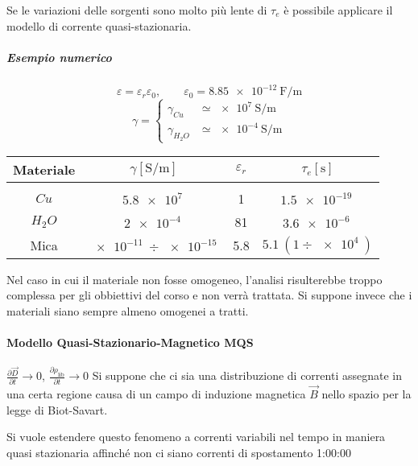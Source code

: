 Se le variazioni delle sorgenti sono molto più lente di $\tau_e$ è possibile applicare
il modello di corrente quasi-stazionaria.
\newpage
\subparagraph{Esempio numerico}
$$
\varepsilon = \varepsilon_r\varepsilon_0,\qquad \varepsilon_0 = \SI{8.85e-12}{\farad\per\meter}
$$
$$
\gamma = 
\begin{cases}
\gamma_{Cu} &\simeq \SI{e7}{\siemens\per\meter}\\
\gamma_{H_2O} &\simeq \SI{e-4}{\siemens\per\meter}
\end{cases}
$$
\begin{table}[H]\centering
\begin{tabular}{|c|c|c|c|}
 \hline Materiale & $\gamma[\si{\siemens\per\meter}]$ & $\varepsilon_r$ & $\tau_e[\si{\second}]$ \\
 \hline  &                                          &               &               \\
 $Cu$        & $\SI{5.8e7}{}$                    &   1           &   $\SI{1.5e-19}{}$ \\ 
 $H_2O$           & $\SI{2e-4}{} $                   &       81         & $\SI{3.6e-6}{}$ \\  
 Mica               & $\SI{e-11}{}\div\SI{e-15}{}$       &  5.8        &   $\SI{5.1}{}\left(1\div\SI{e4}{}\right)$ \\ \hline
\end{tabular}
\end{table}

Nel caso in cui il materiale non fosse omogeneo, l'analisi risulterebbe troppo complessa per gli
obbiettivi del corso e non verrà trattata. Si suppone invece che i materiali siano sempre almeno 
omogenei a tratti.

\paragraph{Modello Quasi-Stazionario-Magnetico MQS}
$\frac{\partial\vec{D}}{\partial t} \to 0$, $\frac{\partial\rho_\text{lib}}{\partial t}\to 0$
Si suppone che ci sia una distribuzione di correnti assegnate in una certa regione causa
di un campo di induzione magnetica $\vec{B}$ nello spazio per la legge di Biot-Savart.

Si vuole estendere questo fenomeno a correnti variabili nel tempo in maniera quasi stazionaria
affinché non ci siano correnti di spostamento
1:00:00
